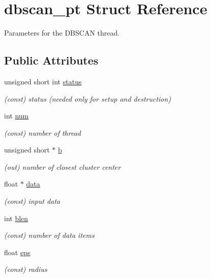 \hypertarget{structdbscan__pt}{}\section{dbscan\+\_\+pt Struct Reference}
\label{structdbscan__pt}


Parameters for the D\+B\+S\+C\+AN thread.  


\subsection*{Public Attributes}
\begin{DoxyCompactItemize}
\item 
unsigned short int \mbox{\hyperlink{structdbscan__pt_a5a42d9fe57034198ed5250f6f0ddb2cb}{status}}
\begin{DoxyCompactList}\small\item\em (const) status (needed only for setup and destruction) \end{DoxyCompactList}\item 
int \mbox{\hyperlink{structdbscan__pt_aaa1b99005b0207af9c85a6fc73368eb3}{num}}
\begin{DoxyCompactList}\small\item\em (const) number of thread \end{DoxyCompactList}\item 
unsigned short $\ast$ \mbox{\hyperlink{structdbscan__pt_aab10762fb46be396c06f36c7b8f84f64}{b}}
\begin{DoxyCompactList}\small\item\em (out) number of closest cluster center \end{DoxyCompactList}\item 
float $\ast$ \mbox{\hyperlink{structdbscan__pt_a1da0197a70e570bd30de1872fe60cd6b}{data}}
\begin{DoxyCompactList}\small\item\em (const) input data \end{DoxyCompactList}\item 
int \mbox{\hyperlink{structdbscan__pt_ac172b388c85db693e07e954f7d29e681}{blen}}
\begin{DoxyCompactList}\small\item\em (const) number of data items \end{DoxyCompactList}\item 
float \mbox{\hyperlink{structdbscan__pt_ae73ddeeaca04d08756b022115639d607}{eps}}
\begin{DoxyCompactList}\small\item\em (const) radius \end{DoxyCompactList}\item 

\end{DoxyCompactItemize}
